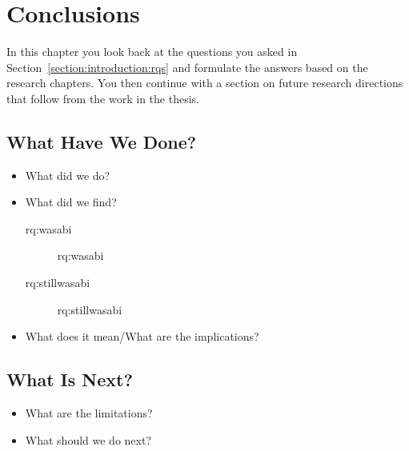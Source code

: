 
\chapter{Conclusions}
\label{chapter:conclusions}

\acresetall

In this chapter you look back at the questions you asked in Section~\ref{section:introduction:rqs} and formulate the answers based on the research chapters. You then continue with a section on future research directions that follow from the work in the thesis.

\section{What Have We Done?}
\begin{itemize}
\item What did we do?
\item What did we find?
\begin{description}\item[\acs{rq:wasabi}]\acl{rq:wasabi}\end{description}
\begin{description}\item[\acs{rq:stillwasabi}]\acl{rq:stillwasabi}\end{description}
\item What does it mean/What are the implications?
\end{itemize}


\section{What Is Next?}
\begin{itemize}
\item What are the limitations?
\item What should we do next?
\end{itemize}